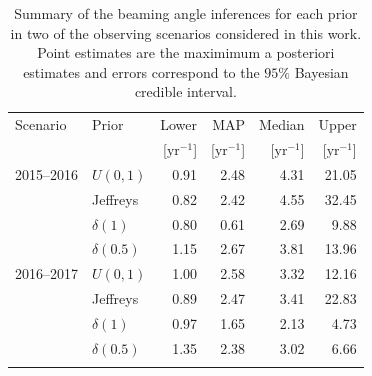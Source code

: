 \documentclass[twocolumn,nofootinbib]{revtex4-1}
\newcommand{\yr}{\mathrm{yr}}
\begin{document}
\begin{table}
\centering
\begin{tabular}{llrrrr}
  \toprule
  Scenario & Prior & Lower & MAP & Median & Upper \\
  && [$\yr^{-1}$] & [$\yr^{-1}$]    & [$\yr^{-1}$]    & [$\yr^{-1}$]  \\
  \colrule
2015--2016 & $U(0,1)$ & 0.91 & 2.48 & 4.31 & 21.05\\
           & Jeffreys & 0.82 & 2.42 & 4.55 & 32.45\\
        & $\delta(1)$ & 0.80 & 0.61 & 2.69 & 9.88\\
      & $\delta(0.5)$ & 1.15 & 2.67 & 3.81 & 13.96\\
  \colrule
    2016--2017 & $U(0,1)$ & 1.00 & 2.58 & 3.32 & 12.16\\
               & Jeffreys & 0.89 & 2.47 & 3.41 & 22.83\\
             &$\delta(1)$ & 0.97 & 1.65 & 2.13 & 4.73\\
           &$\delta(0.5)$ & 1.35 & 2.38 & 3.02 & 6.66\\
\botrule
\end{tabular}
\caption{Summary of the beaming angle inferences for each prior in two of the observing scenarios considered in this work.
    Point estimates are the maximimum a posteriori estimates and errors correspond to the $95\%$ Bayesian credible interval.
    \label{tab:aligo_beam_inference}}
\end{table}
\end{document}
